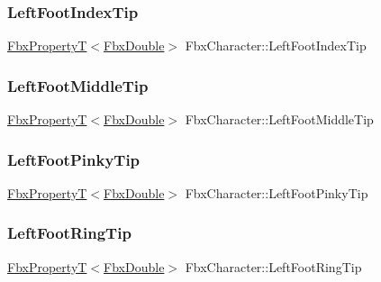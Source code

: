 \subsubsection{\texorpdfstring{Left\+Foot\+Index\+Tip}{LeftFootIndexTip}}
{\footnotesize\ttfamily \hyperlink{class_fbx_property_t}{Fbx\+PropertyT}$<$\hyperlink{fbxtypes_8h_a171e72a1c46fc15c1a6c9c31948c1c5b}{Fbx\+Double}$>$ Fbx\+Character\+::\+Left\+Foot\+Index\+Tip}

\mbox{\label{class_fbx_character_ab17d6be58ceb88b575305663a5e37b3d}} 
\subsubsection{\texorpdfstring{Left\+Foot\+Middle\+Tip}{LeftFootMiddleTip}}
{\footnotesize\ttfamily \hyperlink{class_fbx_property_t}{Fbx\+PropertyT}$<$\hyperlink{fbxtypes_8h_a171e72a1c46fc15c1a6c9c31948c1c5b}{Fbx\+Double}$>$ Fbx\+Character\+::\+Left\+Foot\+Middle\+Tip}

\mbox{\label{class_fbx_character_ab6770f15c802efcd4b85d89b1b6464be}} 
\subsubsection{\texorpdfstring{Left\+Foot\+Pinky\+Tip}{LeftFootPinkyTip}}
{\footnotesize\ttfamily \hyperlink{class_fbx_property_t}{Fbx\+PropertyT}$<$\hyperlink{fbxtypes_8h_a171e72a1c46fc15c1a6c9c31948c1c5b}{Fbx\+Double}$>$ Fbx\+Character\+::\+Left\+Foot\+Pinky\+Tip}

\mbox{\label{class_fbx_character_a713205fb2db938b34a01b78bed306bf0}} 
\subsubsection{\texorpdfstring{Left\+Foot\+Ring\+Tip}{LeftFootRingTip}}
{\footnotesize\ttfamily \hyperlink{class_fbx_property_t}{Fbx\+PropertyT}$<$\hyperlink{fbxtypes_8h_a171e72a1c46fc15c1a6c9c31948c1c5b}{Fbx\+Double}$>$ Fbx\+Character\+::\+Left\+Foot\+Ring\+Tip}

